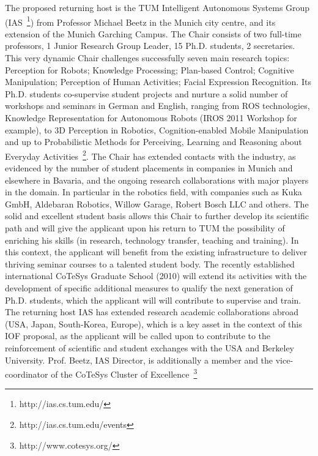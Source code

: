 The proposed returning host  is the TUM Intelligent Autonomous Systems
Group (IAS~\footnote{http://ias.cs.tum.edu/}) from Professor Michael  
Beetz in the Munich city centre, and its extension of the Munich Garching 
Campus. The Chair consists of two  full-time   professors,  1  Junior  
Research   Group  Leader,  15 Ph.D.  students, 2  secretaries.  This  very dynamic  Chair challenges
successfully  seven  main  research  topics: Perception  for  Robots;
Knowledge Processing; Plan-based Control; Cognitive Manipulation; 
Perception of  Human Activities; Facial Expression Recognition.
Its Ph.D.  students co-supervise student projects and  nurture a solid
number of workshops  and seminars in German and  English, ranging from
ROS technologies, Knowledge Representation for Autonomous Robots (IROS
2011   Workshop  for   example),   to  3D   Perception  in   Robotics,
Cognition-enabled Mobile Manipulation  and up to Probabilistic Methods
for Perceiving, Learning and Reasoning about Everyday Activities~\footnote{http://ias.cs.tum.edu/events}. 
The Chair has  extended contacts  with the industry,  as evidenced  by the
number of student  placements in companies in Munich  and elsewhere in
Bavaria, and the ongoing research collaborations with major players in
the domain. In particular  in the robotics field,  with companies
such  as Kuka  GmbH, Aldebaran  Robotics, Willow Garage, Robert Bosch LLC  
and others.   The solid  and excellent  student basis  allows  this Chair  
to  further develop  its scientific path and  will give the applicant upon 
his return  to TUM the possibility of enriching his skills (in research, 
technology transfer, teaching and training).  In  this  context,   the applicant  
will  benefit  from  the  existing infrastructure  to  deliver thriving  
seminar  courses  to a  talented
student body. The  recently established international CoTeSys Graduate
School  (2010) will  extend  its activities  with  the development  of
specific  additional  measures  to  qualify  the  next  generation  of
Ph.D. students, which  the applicant will will contribute to supervise  and train.  The
returning  host  IAS has  extended  research academic  collaborations
abroad (USA, Japan, South-Korea, Europe),  which is a key asset in the
context of this  IOF proposal, as the applicant will be  called upon to contribute
to the reinforcement of scientific  and student exchanges with the USA
and Berkeley University.
Prof.  Beetz,  IAS  Director,   is  additionally  a  member  and  the
vice-coordinator of the CoTeSys  Cluster of Excellence~\footnote{http://www.cotesys.org/} 
